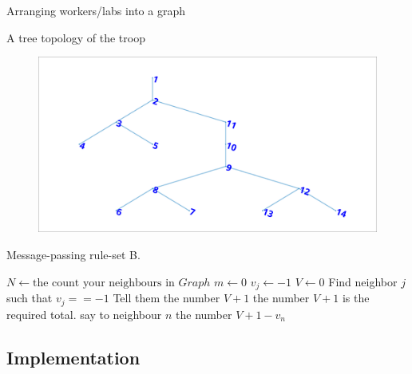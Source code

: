 \documentclass[pdflatex,colorlinks,landscape]{beamer}
\begin{document}
\begin{frame}[allowframebreaks]{Arranging workers/labs into a graph}
  \begin{small}
    
  \end{small}
\end{frame}  

\begin{frame}{A tree topology of the troop}
  \begin{figure}
    \includegraphics[width=\textwidth]{TroopTopology.png}
  \end{figure}
\end{frame}

\begin{frame}[allowframebreaks]{Message-passing rule-set B.}
  \begin{algorithmic}[1]
      \State $N \gets \text{the count your neighbours in $Graph$}$
      \State $m\gets 0$ 
        \State $v_j\gets -1$ 
      \EndFor
      \State $V\gets 0$ 
        \State Find neighbor $j$ such that $v_j==-1$
        \State Tell them the number $V + 1$
      \EndIf
      \newpage
        \State the number $V + 1$ is the required total.
          \State say to neighbour $n$ the number $V + 1 - v_n$
        \EndFor
      \EndIf
    \EndProcedure
  \end{algorithmic}
\end{frame}

\subsection{Implementation}
\end{document}
